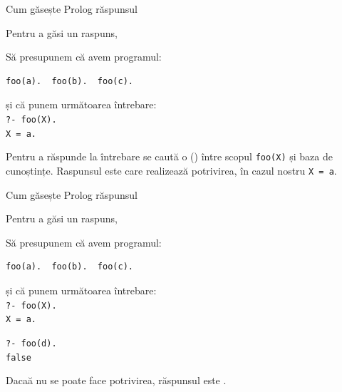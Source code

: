 \documentclass[xcolor=x11names,compress,10pt]{beamer}
\begin{document}
\begin{frame}[fragile]{Cum găsește Prolog răspunsul}

Pentru a găsi un raspuns, 

\medskip 
\begin{example}

Să presupunem că avem programul: 
\begin{verbatim}
foo(a).  foo(b).  foo(c).
\end{verbatim}
și că punem următoarea întrebare: \\
{\color{blue}\texttt{?- foo(X).}}\\
{\color{blue}\texttt{X = a.}}\\
\end{example}

Pentru a răspunde la întrebare se caută o  () între scopul {\color{blue}\texttt{foo(X)}} și baza de cunoștințe. Raspunsul este  care realizează potrivirea, în cazul nostru {\color{blue}\texttt{X = a}}. 

\begin{center}
\end{center}

\end{frame}



\begin{frame}[fragile]{Cum găsește Prolog răspunsul}

Pentru a găsi un raspuns, 

\medskip 
\begin{example}

Să presupunem că avem programul: 
\begin{verbatim}
foo(a).  foo(b).  foo(c).
\end{verbatim}
și că punem următoarea întrebare: \\
{\color{blue}\texttt{?- foo(X).}}\\
{\color{blue}\texttt{X = a.}}\\
\medskip

{\color{blue}\texttt{?- foo(d).}}\\
{\color{red}\texttt{false}}\\
\smallskip
\end{example}

Dacaă nu se poate face potrivirea, răspunsul este 
{\color{red}{false}}.

\end{frame}
\end{document}
